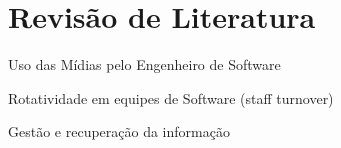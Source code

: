 \chapter{Revisão de Literatura}


Uso das Mídias pelo Engenheiro de Software

Rotatividade em equipes de Software (staff turnover)

Gestão e recuperação da informação

